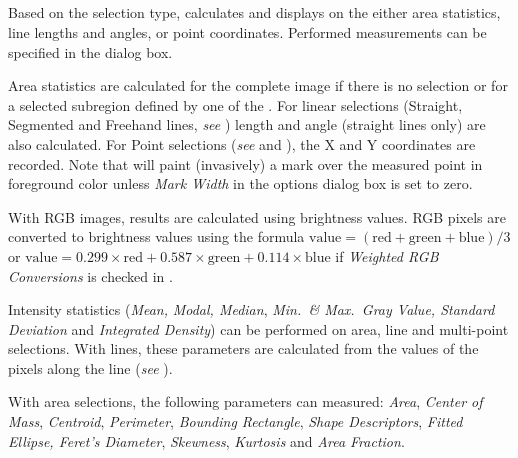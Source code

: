 \subsection[{\protect\userinterface{Measure\ldots{}\ {[}m{]}}}]{\protect{}\label{sub:Measure...[m]}\improvement{}}

Based on the selection type, calculates and displays on the 
either area statistics, line lengths and angles, or point coordinates.
Performed measurements can be specified in the 
dialog box.

Area statistics are calculated for the complete image if there is
no selection or for a selected subregion defined by one of the .
For linear selections (Straight, Segmented and Freehand lines, \emph{see}
) length and angle (straight lines
only) are also calculated. For Point selections (\emph{see} 
and ), the X and Y coordinates are
recorded. Note that  will
paint (invasively) a mark over the measured point in foreground color
unless \emph{Mark Width} in the  options
dialog box is set to zero.

With RGB images, results are calculated using brightness values. RGB
pixels are converted to brightness values using the formula $\text{value}=(\text{red}+\text{green}+\text{blue})/3$
or $\text{value}=0.299\times\text{red}+0.587\times\text{green}+0.114\times\text{blue}$
if \emph{Weighted RGB Conversions} is checked in . 

Intensity statistics (\emph{Mean,} \emph{Modal, Median},\emph{ Min.\ \&
Max.\ Gray Value, Standard Deviation} and \emph{Integrated Density})
can be performed on area, line and multi-point selections. With lines,
these parameters are calculated from the values of the pixels along
the line (\emph{see} ).

With area selections, the following parameters can measured: \emph{Area},
\emph{Center of Mass}, \emph{Centroid}, \emph{Perimeter}, \emph{Bounding
Rectangle}, \emph{Shape Descriptors}, \emph{Fitted Ellipse, Feret's
Diameter}, \emph{Skewness}, \emph{Kurtosis} and \emph{Area Fraction}.




